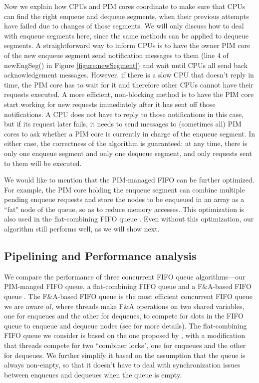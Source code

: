 Now we explain how CPUs and PIM cores coordinate to make sure that CPUs can find the right enqueue 
and dequeue segments, when their previous attempts have failed due to changes of those segments. 
We will only discuss how to deal with enqueue segments here, 
since the same methods can be applied to dequeue segments. 
A straightforward way to inform CPUs is to have the owner PIM core of the new enqueue segment 
send notification messages to them (line 4 of newEngSeg() in Figure \ref{figure:newSegment}) 
and wait until CPUs all send back acknowledgement messages. 
However, if there is a slow CPU that doesn't reply in time, 
the PIM core has to wait for it and therefore other CPUs cannot have their requests executed. 
A more efficient, non-blocking method is to have the PIM core start working for new requests 
immediately after it has sent off those notifications. 
A CPU does not have to reply to those notifications in this case, 
but if its request later fails, it needs to send messages to (sometimes all) PIM cores 
to ask whether a PIM core is currently in charge of the enqueue segment.
In either case, the correctness of the algorithm is guaranteed:  
at any time, there is only one enqueue segment and only one dequeue segment, 
and only requests sent to them will be executed. 
  
We would like to mention that the PIM-managed FIFO can be further optimized. 
For example, the PIM core holding the enqueue segment can combine multiple pending enqueue requests 
and store the nodes to be enqueued in an array as a ``fat" node of the queue, 
so as to reduce memory accesses. 
This optimization is also used in the flat-combining FIFO queue \cite{Hendler10}. 
Even without this optimization, our algorithm still performs well, as we will show next. 

\subsection{Pipelining and Performance analysis}
We compare the performance of three concurrent FIFO queue algorithms---our PIM-manged FIFO queue, 
a flat-combining FIFO queue and a F\&A-based FIFO queue \cite{Morrison13}. 
The F\&A-based FIFO queue is the most efficient concurrent FIFO queue we are aware of, 
where threads make F\&A operations on two shared variables, 
one for enqueues and the other for dequeues, to compete for slots in the FIFO queue to 
enqueue and dequeue nodes (see \cite{Morrison13} for more details). 
The flat-combining FIFO queue we consider is based on the one proposed by \cite{Hendler10}, 
with a modification that threads compete for two ``combiner locks", 
one for enqueues and the other for dequeues. 
We further simplify it based on the assumption that the queue is always non-empty, 
so that it doesn't have to deal with synchronization issues between enqueues and dequeues 
when the queue is empty. 

